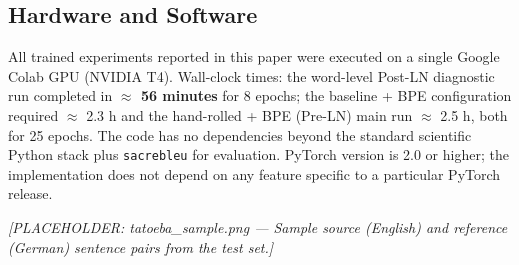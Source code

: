 \subsection{Hardware and Software}

All trained experiments reported in this paper were executed on a single Google Colab GPU (NVIDIA T4). Wall-clock times: the word-level Post-LN diagnostic run completed in \textbf{$\approx$ 56 minutes} for 8 epochs; the baseline + BPE configuration required $\approx$ 2.3 h and the hand-rolled + BPE (Pre-LN) main run $\approx$ 2.5 h, both for 25 epochs. The code has no dependencies beyond the standard scientific Python stack plus \texttt{sacrebleu} for evaluation. PyTorch version is 2.0 or higher; the implementation does not depend on any feature specific to a particular PyTorch release.

\textit{[PLACEHOLDER: tatoeba\_sample.png --- Sample source (English) and reference (German) sentence pairs from the test set.]}
